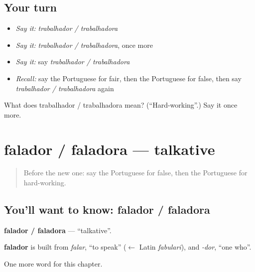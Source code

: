 \subsection*{Your turn}
\begin{itemize}
\raggedright
  \item \emph{Say it:} \emph{trabalhador / trabalhadora}
  \item \emph{Say it:} \emph{trabalhador / trabalhadora}, once more
  \item \emph{Say it:} say \emph{trabalhador / trabalhadora}
  \item \emph{Recall:} say the Portuguese for fair, then the Portuguese for false, then say \emph{trabalhador / trabalhadora} again
\end{itemize}

\begin{tcolorbox}[breakable,colback=teal!4,colframe=teal!35!black,title={Before you move on}]
What does trabalhador / trabalhadora mean? (\textquotedblleft{}Hard-working\textquotedblright{}.) Say it once more.
\end{tcolorbox}
\section[falador / faladora]{falador / faladora — talkative}

\label{lesson:PT-C187-falador-faladora}



\begin{quote}
Before the new one: say the Portuguese for false, then the Portuguese for hard-working.
\end{quote}

\subsection*{You'll want to know: falador / faladora}
\textbf{falador / faladora} — \textquotedblleft{}talkative\textquotedblright{}.

\begin{cousinweb}
\textbf{falador} is built from \emph{falar}, \textquotedblleft{}to speak\textquotedblright{} ($\leftarrow$ Latin \emph{fabulari}), and \emph{-dor}, \textquotedblleft{}one who\textquotedblright{}.
\end{cousinweb}

\begin{grammarlens}[title={What you've built}]
One more word for this chapter.
\end{grammarlens}

